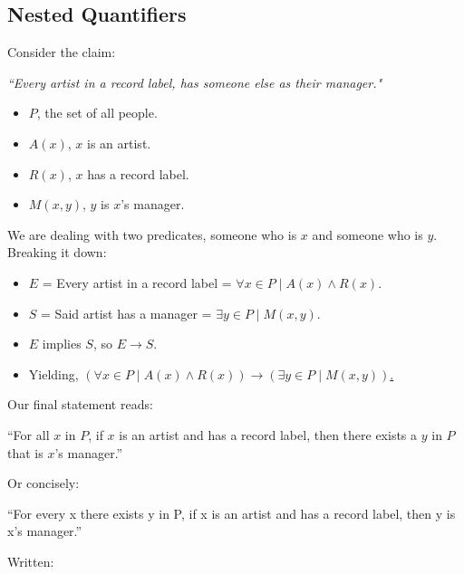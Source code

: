 \subsection{Nested Quantifiers}

\noindent
Consider the claim:

\begin{center}
    \Large
    \textit{``Every artist in a record label, has someone else as their manager."}
\end{center}

\begin{itemize}
    \item $P$, the set of all people.
    \item $A(x)$, $x$ is an artist.
    \item $R(x)$, $x$ has a record label.
    \item $M(x, y)$, $y$ is $x$'s manager.
\end{itemize}

\noindent
We are dealing with two predicates, someone who is $x$ and someone who is $y$. Breaking it down:
\begin{itemize}
    \item $E$ = Every artist in a record label = $\forall x \in P \mid A(x) \land R(x)$.
    \item $S$ = Said artist has a manager =  $\exists y \in P \mid M(x, y)$.
    \item $E$ implies $S$, so $E \rightarrow S$.
    \item Yielding, \underline{$(\forall x \in P \mid A(x) \land R(x)) \rightarrow (\exists y \in P \mid M(x, y))$.}
\end{itemize}

\noindent
Our final statement reads:

\begin{center}
    \Large
    ``For all $x$ in $P$, if $x$ is an artist and has a record label, then there exists a $y$ in $P$ that is $x$'s manager.''
\end{center}

\noindent
Or concisely:\\

\begin{center}
    \Large
    ``For every x there exists y in P, if x is an artist and has a record label, then y is x's manager.''
\end{center}

\noindent
Written:\\

